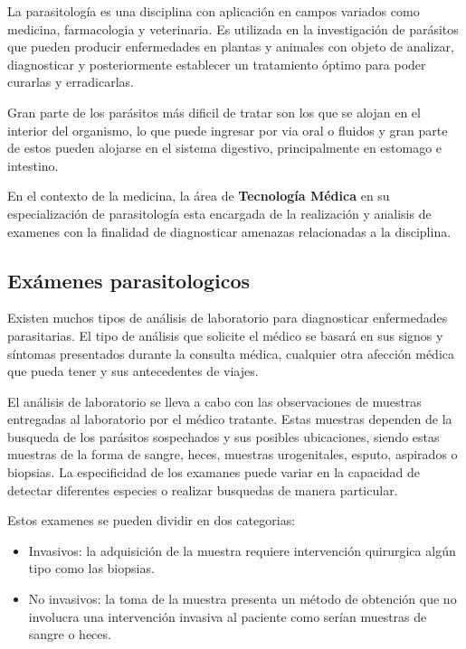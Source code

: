 \documentclass[letter,12pt]{report}
\begin{document}
La parasitología es una disciplina con aplicación en campos variados como medicina,
farmacologia y veterinaria. Es utilizada en la investigación de parásitos que pueden
producir enfermedades en plantas y animales con objeto de analizar, diagnosticar y
posteriormente establecer un tratamiento óptimo para poder curarlas y erradicarlas.

Gran parte de los parásitos más dificil de tratar son los que se alojan en el
interior del organismo, lo que puede ingresar por via oral o fluidos y gran parte de
estos pueden alojarse en el sistema digestivo, principalmente en estomago e
intestino.

En el contexto de la medicina, la área de \textbf{Tecnología Médica} en su
especialización de parasitología esta encargada de la realización y analisis de
examenes con la finalidad de diagnosticar amenazas relacionadas a la disciplina.

\subsection{Exámenes parasitologicos}

Existen muchos tipos de análisis de laboratorio para diagnosticar enfermedades parasitarias.
El tipo de análisis que solicite el médico se basará en sus signos y síntomas presentados
durante la consulta médica, cualquier otra afección médica que pueda tener y sus
antecedentes de viajes.

El análisis de laboratorio se lleva a cabo con las observaciones de muestras entregadas
al laboratorio por el médico tratante. Estas muestras dependen de la busqueda de los
parásitos sospechados y sus posibles ubicaciones, siendo estas muestras de la forma de
sangre, heces, muestras urogenitales, esputo, aspirados o biopsias. La especificidad de
los examanes puede variar en la capacidad de detectar diferentes especies o realizar
busquedas de manera particular.

Estos examenes se pueden dividir en dos categorias:

\begin{itemize}
    \item Invasivos: la adquisición de la muestra requiere intervención
        quirurgica algún tipo como las biopsias.
    \item No invasivos: la toma de la muestra presenta un método de obtención que no
        involucra una intervención invasiva al paciente como serían muestras de sangre o
        heces.
\end{itemize}
\end{document}
